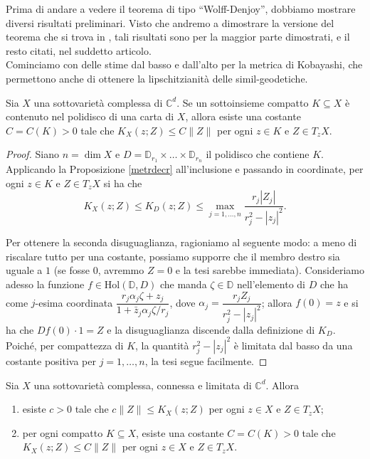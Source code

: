 Prima di andare a vedere il teorema di tipo ``Wolff-Denjoy'', dobbiamo mostrare diversi risultati preliminari. Visto che andremo a dimostrare la versione del teorema che si trova in \cite{CMS}, tali risultati sono per la maggior parte dimostrati, e il resto citati, nel suddetto articolo. \\

Cominciamo con delle stime dal basso e dall'alto per la metrica di Kobayashi, che permettono anche di ottenere la lipschitzianità delle simil-geodetiche.

\begin{lm} \label{polycpt}
    Sia $X$ una sottovarietà complessa di $\mathbb{C}^d$. Se un sottoinsieme compatto $K\subseteq X$ è contenuto nel polidisco di una carta di $X$, allora esiste una costante $C=C(K)>0$ tale che $K_X(z;Z) \le C\|Z\|$ per ogni $z \in K$ e $Z \in T_zX$.
\end{lm}

\begin{proof}
    Siano $n=\dim{X}$ e $D=\mathbb{D}_{r_1}\times\dots\times\mathbb{D}_{r_n}$ il polidisco che contiene $K$. Applicando la Proposizione \ref{metrdecr} all'inclusione e passando in coordinate, per ogni $z \in K$ e $Z \in T_zX$ si ha che
    $$K_X(z;Z) \le K_D(z;Z) \le \max_{j=1,\dots,n} \frac{r_j|Z_j|}{r_j^2-|z_j|^2}.$$
    
    Per ottenere la seconda disuguaglianza, ragioniamo al seguente modo: a meno di riscalare tutto per una costante, possiamo supporre che il membro destro sia uguale a $1$ (se fosse $0$, avremmo $Z=0$ e la tesi sarebbe immediata). Consideriamo adesso la funzione $f\in\text{Hol}(\mathbb{D},D)$ che manda $\zeta\in\mathbb{D}$ nell'elemento di $D$ che ha come $j$-esima coordinata $\dfrac{r_j\alpha_j\zeta+z_j}{1+\bar{z}_j\alpha_j\zeta/r_j}$, dove $\alpha_j=\dfrac{r_jZ_j}{r_j^2-|z_j|^2}$; allora $f(0)=z$ e si ha che $Df(0)\cdot 1=Z$ e la disuguaglianza discende dalla definizione di $K_D$. Poiché, per compattezza di $K$, la quantità $r_j^2-|z_j|^2$ è limitata dal basso da una costante positiva per $j=1,\dots,n$, la tesi segue facilmente.
\end{proof}

\begin{prop} \label{metrica_bilip}
    Sia $X$ una sottovarietà complessa, connessa e limitata di $\mathbb{C}^d$. Allora
    \begin{enumerate}[label={(\arabic*)}]
        \item esiste $c>0$ tale che $c\|Z\| \le K_X(z;Z)$ per ogni $z \in X$ e $Z \in T_zX$;
        \item per ogni compatto $K\subseteq X$, esiste una costante $C=C(K)>0$ tale che $K_X(z;Z) \le C\|Z\|$ per ogni $z \in X$ e $Z \in T_zX$.
    \end{enumerate}
\end{prop}

